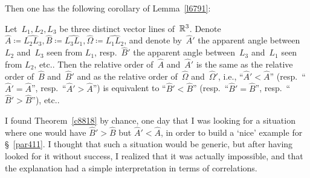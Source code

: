 Then one has the following corollary of Lemma~\ref{l6791}:
%
\begin{Thm}\label{c8818}
Let~$L_1,L_2,L_3$ be three distinct vector lines of~$\mathbb{R}^3$.
Denote $\widehat{A} \coloneqq \widehat{L_2L_3}, \widehat{B} \coloneqq \widehat{L_3L_1},
\widehat{\Omega} \coloneqq \widehat{L_1L_2}$,
and denote by~$\widehat{A}'$ the apparent angle between~$L_2$ and~$L_3$ seen from $L_1$,
resp.~$\widehat{B}'$ the apparent angle between~$L_3$ and~$L_1$ seen from $L_2$,
etc..
Then the relative order of~$\widehat{A}$ and~$\widehat{A}'$ is the same
as the relative order of~$\widehat{B}$ and~$\widehat{B}'$
and as the relative order of~$\widehat{\Omega}$ and~$\widehat{\Omega}'$, i.e.,
``$\widehat{A}'<\widehat{A}$'' (resp.\ ``$\widehat{A}'=\widehat{A}$'',
resp.\ ``$\widehat{A}'>\widehat{A}$'')
is equivalent to ``$\widehat{B}'<\widehat{B}$'' (resp.\ ``$\widehat{B}'=\widehat{B}$'',
resp.\ ``$\widehat{B}'>\widehat{B}$''),
etc..
\end{Thm}

\begin{Rmk}
I found Theorem~\ref{c8818} by chance, one day that I was looking for a situation
where one would have $\widehat{B}' > \widehat{B}$ but $\widehat{A}' < \widehat{A}$,
in order to build a `nice' example for \S~\ref{par411}.
I thought that such a situation would be generic,
but after having looked for it without success,
I realized that it was actually impossible, and that the explanation had a simple
interpretation in terms of correlations.
\end{Rmk}

